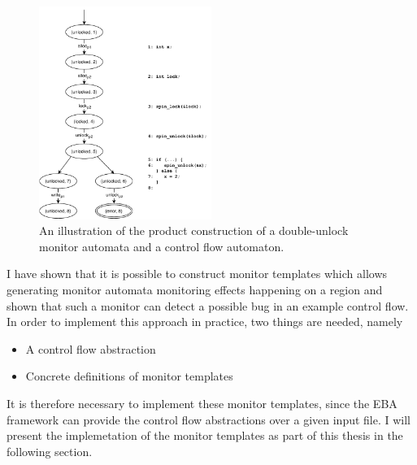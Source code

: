 \begin{figure}[H]
    \centering
    \includegraphics[width=0.5\textwidth]{algorithm/figures/cfg_unlock-product}
    \caption{An illustration of the product construction of a double-unlock monitor automata and a control flow automaton.}
    \label{cfg_unlock-product}
\end{figure}

\newpar I have shown that it is possible to construct monitor templates which allows generating monitor automata monitoring effects happening on a region and shown that such a monitor can detect a possible bug in an example control flow. In order to implement this approach in practice, two things are needed, namely

\begin{itemize}
    \item A control flow abstraction
    \item Concrete definitions of monitor templates
\end{itemize}

\noindent It is therefore necessary to implement these monitor templates, since the EBA framework can provide the control flow abstractions over a given input file. I will present the implemetation of the monitor templates as part of this thesis in the following section. 